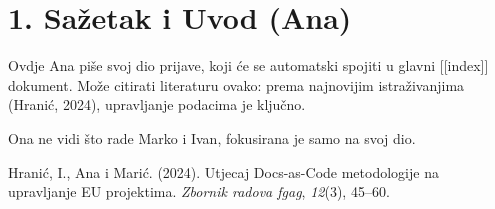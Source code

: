 \documentclass[
  croatian,
  11pt,
  a4paper,
]{article}
\author{}
\date{}
\newlength{\cslhangindent}
\newenvironment{CSLReferences}[2] %
 {\begin{list}{}{%
  \setlength{\itemindent}{0pt}
  \setlength{\leftmargin}{0pt}
  \setlength{\parsep}{0pt}
  \ifodd #1
   \setlength{\leftmargin}{\cslhangindent}
   \setlength{\itemindent}{-1\cslhangindent}
  \fi
  \setlength{\itemsep}{#2\baselineskip}}}
 {\end{list}}
\renewcommand*\contentsname{Table of contents}
\newcommand\contentsname{Table of contents}
\begin{document}
\renewcommand*\contentsname{Sadržaj}
{
\setcounter{tocdepth}{3}
\tableofcontents
}

\section{1. Sažetak i Uvod (Ana)}\label{saux17eetak-i-uvod-ana}

Ovdje Ana piše svoj dio prijave, koji će se automatski spojiti u glavni
{[}{[}index{]}{]} dokument. Može citirati literaturu ovako: prema
najnovijim istraživanjima (Hranić, 2024), upravljanje podacima je
ključno.

Ona ne vidi što rade Marko i Ivan, fokusirana je samo na svoj dio.

\protect{}\label{refs}
\begin{CSLReferences}{1}{0}
Hranić, I., Ana i Marić. (2024). Utjecaj Docs-as-Code metodologije na
upravljanje EU projektima. \emph{Zbornik radova fgag}, \emph{12}(3),
45--60.

\end{CSLReferences}
\end{document}

